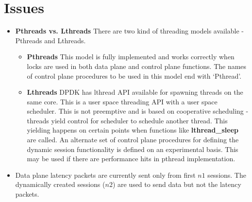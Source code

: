\section{Issues}
\begin{itemize}
	\item \textbf{Pthreads vs. Lthreads}
	There are two kind of threading models available - Pthreads and Lthreads.
	\begin{itemize}
		\item \textbf{Pthreads} This model is fully implemented and works correctly when locks are used in both data plane and control plane functions. The names of control plane procedures to be used in this model end with `Pthread'.
		\item \textbf{Lthreads} DPDK has lthread API available for spawning threads on the 
		same core. This is a user space threading API with a user space scheduler. This is 
		not preemptive and is based on cooperative scheduling -threads yield control for 
		scheduler to schedule another thread. This yielding happens on certain points when 
		functions like \textbf{lthread\_sleep} are called. An alternate set of control plane procedures for defining the dynamic session functionality is defined on an experimental basis. This may be used if there are performance hits in pthread implementation.
	\end{itemize}
	\item Data plane latency packets are currently sent only from first $n1$ sessions. The dynamically created sessions ($n2$) are used to send data but not the latency packets.

\end{itemize}
